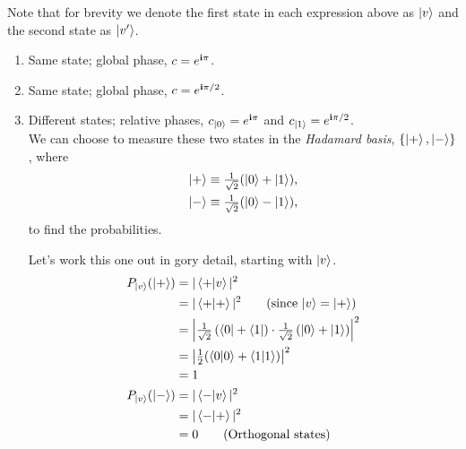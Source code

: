 Note that for brevity we denote the first state in each expression above as $\ket{v}$ and the second
state as $\ket{v'}$.
\begin{enumerate}[label=\alph*.,ref={Sol.~\thesection\alph*}]
    \item Same state; global phase, $c = e^{\mathbf{i} \pi}$.
    \item Same state; global phase, $c = e^{\mathbf{i} \pi/2}$.
    \item Different states; relative phases, $c_{\ket{0}} = e^{\mathbf{i} \pi}$ and $c_{\ket{1}} = e^{\mathbf{i} \pi/2}$. \\
    We can choose to measure these two states in the \textit{Hadamard basis}, $\{ \ket{+}, \ket{-} \}$, where
    \begin{align}
    \label{eqn:hadamardbasis}
        \ket{+} &\equiv \tfrac{1}{\sqrt{2}} (\ket{0} + \ket{1}), \\
        \ket{-} &\equiv \tfrac{1}{\sqrt{2}} (\ket{0} - \ket{1}),
    \end{align}
    to find the probabilities.

    Let's work this one out in gory detail, starting with $\ket{v}$.
    \begin{align}
        P_{\ket{v}}(\ket{+}) &= |\bra{+} \ket{v}|^2 \nonumber \\
        &= |\braket{+}|^2 \tag{\text{since} $\ket{v} = \ket{+}$} \nonumber \\
        &= \left |\tfrac{1}{\sqrt{2}} \left (\bra{0} + \bra{1} \right ) \cdot \tfrac{1}{\sqrt{2}} \left (\ket{0} + \ket{1} \right ) \right |^2 \nonumber \\
        &= \left |\tfrac{1}{2} (\braket{0} + \braket{1}) \right |^2 \nonumber \\
        &= 1 \nonumber \\
        P_{\ket{v}}(\ket{-}) &= |\bra{-} \ket{v}|^2 \nonumber \\
        &= |\bra{-} \ket{+}|^2 \nonumber \\
        &= 0 \tag{Orthogonal states}
    \end{align}


\end{enumerate}

